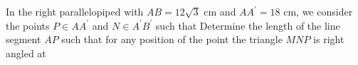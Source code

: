 In the right parallelopiped  with $AB=12\sqrt{3}$ cm and $AA^{\prime}=18$ cm, we consider the points $P\in AA^{\prime}$ and $N\in A^{\prime}B^{\prime}$ such that  Determine the length of the line segment $AP$ such that for any position of the point  the triangle $MNP$ is right angled at 